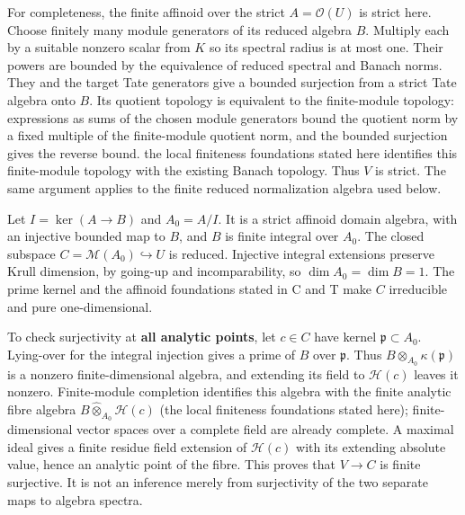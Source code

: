 \documentclass[
  10pt,
]{article}
\begin{document}
For completeness, the finite affinoid over the strict
\(A=\mathcal O(U)\) is strict here. Choose finitely many module
generators of its reduced algebra \(B\). Multiply each by a suitable
nonzero scalar from \(K\) so its spectral radius is at most one. Their
powers are bounded by the equivalence of reduced spectral and Banach
norms. They and the target Tate generators give a bounded surjection
from a strict Tate algebra onto \(B\). Its quotient topology is
equivalent to the finite-module topology: expressions as sums of the
chosen module generators bound the quotient norm by a fixed multiple of
the finite-module quotient norm, and the bounded surjection gives the
reverse bound. the local finiteness foundations stated here identifies
this finite-module topology with the existing Banach topology. Thus
\(V\) is strict. The same argument applies to the finite reduced
normalization algebra used below.

Let \(I=\ker(A\to B)\) and \(A_0=A/I\). It is a strict affinoid domain
algebra, with an injective bounded map to \(B\), and \(B\) is finite
integral over \(A_0\). The closed subspace
\(C=\mathcal M(A_0)\hookrightarrow U\) is reduced. Injective integral
extensions preserve Krull dimension, by going-up and incomparability, so
\(\dim A_0=\dim B=1\). The prime kernel and the affinoid foundations
stated in C and T make \(C\) irreducible and pure one-dimensional.

To check surjectivity at \textbf{all analytic points}, let \(c\in C\)
have kernel \(\mathfrak p\subset A_0\). Lying-over for the integral
injection gives a prime of \(B\) over \(\mathfrak p\). Thus
\(B\otimes_{A_0}\kappa(\mathfrak p)\) is a nonzero finite-dimensional
algebra, and extending its field to \(\mathcal H(c)\) leaves it nonzero.
Finite-module completion identifies this algebra with the finite
analytic fibre algebra \(B\widehat\otimes_{A_0}\mathcal H(c)\) (the
local finiteness foundations stated here); finite-dimensional vector
spaces over a complete field are already complete. A maximal ideal gives
a finite residue field extension of \(\mathcal H(c)\) with its extending
absolute value, hence an analytic point of the fibre. This proves that
\(V\to C\) is finite surjective. It is not an inference merely from
surjectivity of the two separate maps to algebra spectra.
\end{document}
